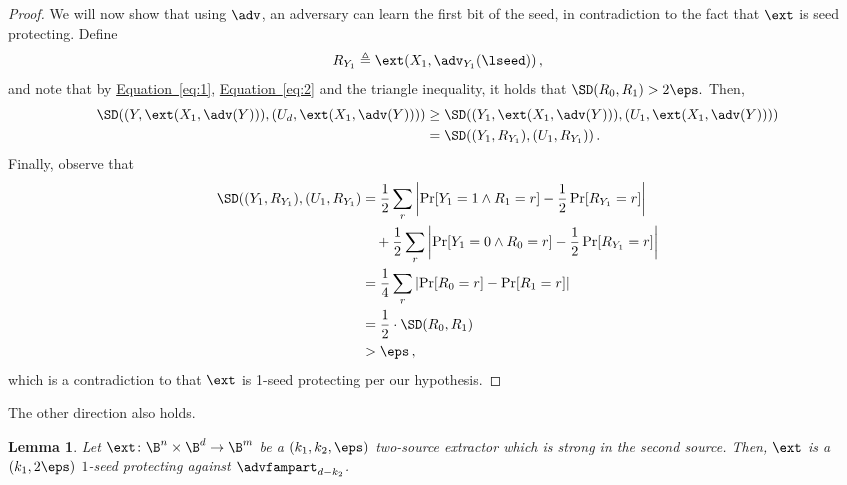 \documentclass[11pt]{article}
\numberwithin{equation}{section}
\newtheorem{lemma}[theorem]{Lemma}
\theoremstyle{definition}
\theoremstyle{plain}
\newcommand{\expeqref}[2]{\hyperref[#2]{#1~\eqref{#2}}}
\begin{document}
\begin{proof}
We will now show that using $\adv$, an adversary can learn the first bit of the seed, in contradiction to the fact that $\ext$ is seed protecting.
Define \[R_{Y_1} \triangleq \ext(X_1,\adv_{Y_1}(\lseed))\,,\] and note that by \expeqref{Equation}{eq:1}, \expeqref{Equation}{eq:2} and the triangle inequality, it holds that 
$\SD(R_0,R_1) > 2\eps.$
Then,
\begin{align*}
\SD(( Y,\ext(X_1,\adv(Y))), (U_d,\ext(X_1,\adv(Y)))) &\geq
\SD(( Y_1,\ext(X_1,\adv(Y))), (U_1, \ext(X_1,\adv(Y)))) \\ 
&=\SD(( Y_1, R_{Y_1}), (U_1,R_{Y_1}))\,.
\end{align*}
%
%
%
Finally, observe that 
\begin{align*}
\SD(( Y_1, R_{Y_1}), (U_1,R_{Y_1}) &= \frac{1}{2}\sum_{r}\left| \Pr[Y_1 = 1 \wedge R_{1} = r] - \frac{1}{2}\Pr[R_{Y_1}=r] \right| \\
&~~~+ \frac{1}{2}\sum_{r}\left| \Pr[Y_1 = 0 \wedge R_{0} = r] - \frac{1}{2}\Pr[R_{Y_1}=r] \right| \\ 
&= \frac{1}{4}\sum_{r}\left| \Pr[R_0 = r] - \Pr[R_1=r] \right| \\ &= \frac{1}{2} \cdot \SD(R_0,R_1) \\ &> \eps\,,
\end{align*}
which is a contradiction to that $\ext$ is 1-seed protecting per our hypothesis.%



\end{proof}

The other direction also holds.

\begin{lemma}\label{lem:two-source}
Let $\ext \colon \B^n \times \B^d \rightarrow \B^m$ be a 
$(k_1,k_2,\eps)$ two-source extractor which is strong in the second source. Then, $\ext$ is a $(k_1,2\eps)$
$1$-seed protecting against $\advfampart_{d-k_2}$.
\end{lemma}
\end{document}
